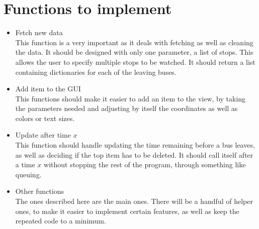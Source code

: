 \documentclass[a4paper]{article}
\begin{document}
\section{Functions to implement}
\begin{itemize}
\item Fetch new data\\
This function is a very important as it deals with fetching as well as cleaning the data. It should be designed with only one parameter, a list of stops. This allows the user to specify multiple stops to be watched. It should return a list containing dictionaries for each of the leaving buses. 

\item Add item to the GUI\\
This functions should make it easier to add an item to the view, by taking the parameters needed and adjusting by itself the coordinates as well as colors or text sizes. 

\item Update after time $x$\\
This function should handle updating the time remaining before a bus leaves, as well as deciding if the top item has to be deleted. It should call itself after a time $x$ without stopping the rest of the program, through something like queuing. 

\item Other functions\\
The ones described here are the main ones. There will be a handful of helper ones, to make it easier to implement certain features, as well as keep the repeated code to a minimum.

\end{itemize}
\end{document}
